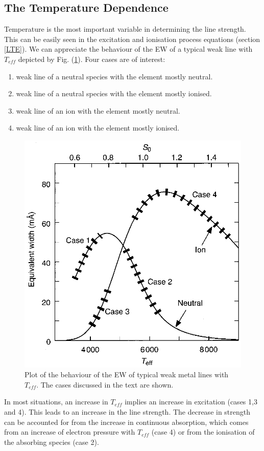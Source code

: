\documentclass[dvips,12pt,a4paper]{report}
\begin{document}
{\subsection{The Temperature Dependence}

Temperature is the most important variable in determining the line strength. This can be easily seen in the excitation and ionisation process equations (section \ref{LTE}).
We can appreciate the behaviour of the EW of a typical weak line with $T_{eff}$ depicted by Fig. (\ref{ewdp}). Four cases are of interest:
\begin{enumerate}
 \item weak line of a neutral species with the element mostly neutral.
 \item weak line of a neutral species with the element mostly ionised.
 \item weak line of an ion with the element mostly neutral.
 \item weak line of an ion with the element mostly ionised.
\end{enumerate}
\begin{figure}[h]
\centering
\includegraphics[height=6 cm]{pics/parte2/temperature.eps}
\caption[EW dependence on Temperature and Pressure] {Plot of the behaviour of the EW of typical weak metal lines with $T_{eff}$. The cases discussed in the text are shown.}%
\label{ewdp}
\end{figure}

In most situations, an increase in $T_{eff}$ implies an increase in excitation (cases 1,3 and 4). This leads to an increase in the line strength. The decrease in strength can be accounted for from the increase in continuous absorption, which comes from an increase of electron pressure with $T_{eff}$ (case 4) or from the ionisation of the absorbing species (case 2).

}
\end{document}
